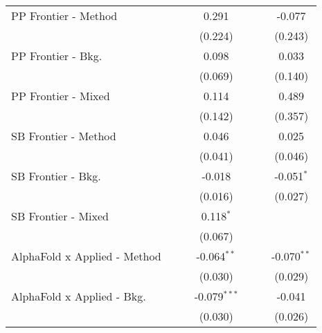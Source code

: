 \begin{tabular}{lcccccc}
   PP Frontier - Method           &               &               & 0.291          &         &               & -0.077\\   
                                  &               &               & (0.224)        &         &               & (0.243)\\   
   PP Frontier - Bkg.             &               &               & 0.098          &         &               & 0.033\\   
                                  &               &               & (0.069)        &         &               & (0.140)\\   
   PP Frontier - Mixed            &               &               & 0.114          &         &               & 0.489\\   
                                  &               &               & (0.142)        &         &               & (0.357)\\   
   SB Frontier - Method           &               &               & 0.046          &         &               & 0.025\\   
                                  &               &               & (0.041)        &         &               & (0.046)\\   
   SB Frontier - Bkg.             &               &               & -0.018         &         &               & -0.051$^{*}$\\   
                                  &               &               & (0.016)        &         &               & (0.027)\\   
   SB Frontier - Mixed            &               &               & 0.118$^{*}$    &         &               &   \\   
                                  &               &               & (0.067)        &         &               &   \\   
   AlphaFold x Applied - Method   &               &               & -0.064$^{**}$  &         &               & -0.070$^{**}$\\   
                                  &               &               & (0.030)        &         &               & (0.029)\\   
   AlphaFold x Applied - Bkg.     &               &               & -0.079$^{***}$ &         &               & -0.041\\   
                                  &               &               & (0.030)        &         &               & (0.026)\\   

\end{tabular}
